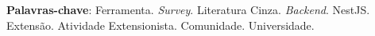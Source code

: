 \begin{resumo}

\vspace{\onelineskip}
    
\noindent
\textbf{Palavras-chave}: Ferramenta. \textit{Survey}. Literatura Cinza. \textit{Backend}. NestJS. Extensão. Atividade Extensionista. Comunidade. Universidade.

\end{resumo}
